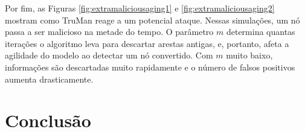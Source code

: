 \begin{resumoextendido}
	Por fim, as Figuras \ref{fig:extramaliciousaging1} e \ref{fig:extramaliciousaging2} mostram como TruMan reage a um potencial ataque.
	Nessas simulações, um nó passa a ser malicioso na metade do tempo.
	O parâmetro $m$ determina quantas iterações o algoritmo leva para descartar arestas antigas, e, portanto, afeta a agilidade do modelo ao detectar um nó convertido.
	Com $m$ muito baixo, informações são descartadas muito rapidamente e o número de falsos positivos aumenta drasticamente.
	
	\section*{Conclusão}
\end{resumoextendido}